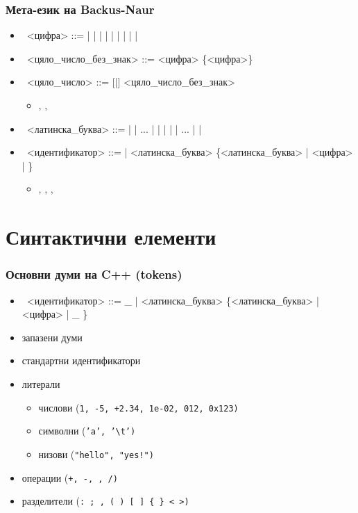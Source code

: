 \documentclass{beamer}
\begin{document}
\begin{frame}
  \frametitle{Мета-език на Backus-Naur}
  \begin{itemize}[<+->]
  \item\ <цифра> ::=  |  |  |  |  |  |  |  |  | 
  \item\ <цяло\_число\_без\_знак> ::= <цифра> \{<цифра>\}
  \item\ <цяло\_число> ::= [\tta{+}|\tta{-}] <цяло\_число\_без\_знак>
    \begin{itemize}
    \item {}, , 
    \end{itemize}
  \item\ <латинска\_буква> ::=  |  | ... |  |  |  |  | ... |  | 
  \item\ <идентификатор> ::=  \tta{\_} | <латинска\_буква> \{<латинска\_буква> | <цифра> | \tta{\_} \}
    \begin{itemize}
    \item {}, , , 
    \end{itemize}
  \end{itemize}
\end{frame}

\section{Синтактични елементи}

\begin{frame}
  \frametitle{Основни думи на C++ (tokens)}
  \begin{itemize}[<+->]
  \item\ <идентификатор> ::= \tta\_ | <латинска\_буква> \{<латинска\_буква> |
      <цифра> | \tta\_ \}
  \item запазени думи
  \item стандартни идентификатори
  \item литерали
    \begin{itemize}
    \item числови (\tt1, \tt{-5}, \tt{+2.34}, \tt{1e-02}, \tt{012}, \tt{0x123})
    \item символни (\tt{'a'}, \tt{'\textbackslash{}t'})
    \item низови (\tt{"hello"}, \tt{"yes!"})
    \end{itemize}
  \item операции (\tt+, \tt-, \tt*, \tt/)
  \item разделители (\tt{: ; , ( ) [ ] \{ \} < >})
  \end{itemize}
\end{frame}
\end{document}
